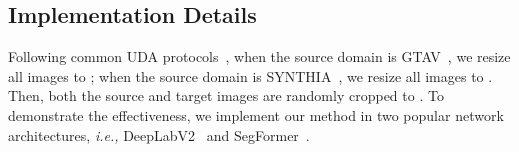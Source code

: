\documentclass[journal]{IEEEtran}
\begin{document}
{\begin{minipage}{\textwidth}
\subsection{Implementation Details}
\label{sec:implementation details}
Following common UDA protocols~\cite{BDL,CLAN}, when the source domain is GTAV~\cite{stephan2016gtav}, we resize all images to ; when the source domain is SYNTHIA~\cite{ros2016synthia}, we resize all images to . Then, both the source and target images are randomly cropped to . To demonstrate the effectiveness, we implement our method in two popular network architectures, \emph{i.e.,} DeepLabV2~\cite{chen2018deeplab} and SegFormer~\cite{xie2021segformer}.
\begin{table*}[t]
\caption{
Comparison results (mIoU) with state-of-the-art methods from SYNTHIA to Cityscapes.}
\label{table:synthia}
\centering
{}
\end{table*}
\end{minipage}}
\end{document}
